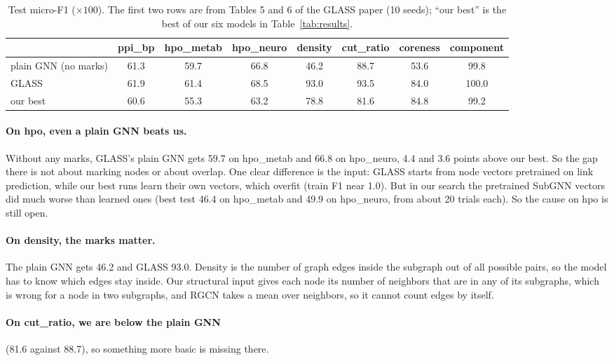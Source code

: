 \documentclass[11pt]{article}
\begin{document}
\begin{table}[H]
\centering
\small
\begin{tabular}{lccccccc}
\toprule
 & ppi\_bp & hpo\_metab & hpo\_neuro & density & cut\_ratio & coreness & component \\
\midrule
plain GNN (no marks) & 61.3 & 59.7 & 66.8 & 46.2 & 88.7 & 53.6 & 99.8 \\
GLASS                & 61.9 & 61.4 & 68.5 & 93.0 & 93.5 & 84.0 & 100.0 \\
our best             & 60.6 & 55.3 & 63.2 & 78.8 & 81.6 & 84.8 & 99.2 \\
\bottomrule
\end{tabular}
\caption{Test micro-F1 ($\times 100$). The first two rows are from Tables 5 and 6 of the GLASS
paper (10 seeds); ``our best'' is the best of our six models in Table~\ref{tab:results}.}
\label{tab:plain}
\end{table}

\paragraph{On hpo, even a plain GNN beats us.} Without any marks, GLASS's plain GNN gets 59.7 on
hpo\_metab and 66.8 on hpo\_neuro, 4.4 and 3.6 points above our best. So the gap there is not
about marking nodes or about overlap. One clear difference is the input: GLASS starts from node
vectors pretrained on link prediction, while our best runs learn their own vectors, which
overfit (train F1 near 1.0). But in our search the pretrained SubGNN vectors did much worse
than learned ones (best test 46.4 on hpo\_metab and 49.9 on hpo\_neuro, from about 20 trials
each). So the cause on hpo is still open.

\paragraph{On density, the marks matter.} The plain GNN gets 46.2 and GLASS 93.0. Density is
the number of graph edges inside the subgraph out of all possible pairs, so the model has to
know which edges stay inside. Our structural input gives each node its number of neighbors that
are in any of its subgraphs, which is wrong for a node in two subgraphs, and RGCN takes a mean
over neighbors, so it cannot count edges by itself.

\paragraph{On cut\_ratio, we are below the plain GNN} (81.6 against 88.7), so something more
basic is missing there.
\end{document}
